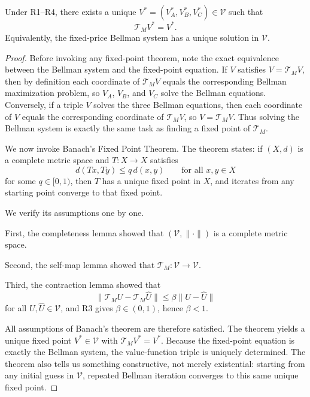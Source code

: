\begin{theorem}
Under R1--R4, there exists a unique $V^*=(V_A^*,V_B^*,V_C^*)\in\mathcal V$ such that
\[
\mathcal T_MV^*=V^*.
\]
Equivalently, the fixed-price Bellman system has a unique solution in $\mathcal V$.
\end{theorem}

\begin{proof}
Before invoking any fixed-point theorem, note the exact equivalence between the Bellman system and the fixed-point equation. If $V$ satisfies $V=\mathcal T_MV$, then by definition each coordinate of $\mathcal T_MV$ equals the corresponding Bellman maximization problem, so $V_A$, $V_B$, and $V_C$ solve the Bellman equations. Conversely, if a triple $V$ solves the three Bellman equations, then each coordinate of $V$ equals the corresponding coordinate of $\mathcal T_MV$, so $V=\mathcal T_MV$. Thus solving the Bellman system is exactly the same task as finding a fixed point of $\mathcal T_M$.

We now invoke Banach's Fixed Point Theorem. The theorem states: if $(X,d)$ is a complete metric space and $T:X\to X$ satisfies
\[
d(Tx,Ty)\le q\,d(x,y)\qquad\text{for all }x,y\in X
\]
for some $q\in[0,1)$, then $T$ has a unique fixed point in $X$, and iterates from any starting point converge to that fixed point.

We verify its assumptions one by one.

First, the completeness lemma showed that $(\mathcal V,\|\cdot\|)$ is a complete metric space.

Second, the self-map lemma showed that $\mathcal T_M:\mathcal V\to\mathcal V$.

Third, the contraction lemma showed that
\[
\|\mathcal T_MU-\mathcal T_M\widehat U\|\le \beta\|U-\widehat U\|
\]
for all $U,\widehat U\in\mathcal V$, and R3 gives $\beta\in(0,1)$, hence $\beta<1$.

All assumptions of Banach's theorem are therefore satisfied. The theorem yields a unique fixed point $V^*\in\mathcal V$ with $\mathcal T_MV^*=V^*$. Because the fixed-point equation is exactly the Bellman system, the value-function triple is uniquely determined. The theorem also tells us something constructive, not merely existential: starting from any initial guess in $\mathcal V$, repeated Bellman iteration converges to this same unique fixed point.
\end{proof}

